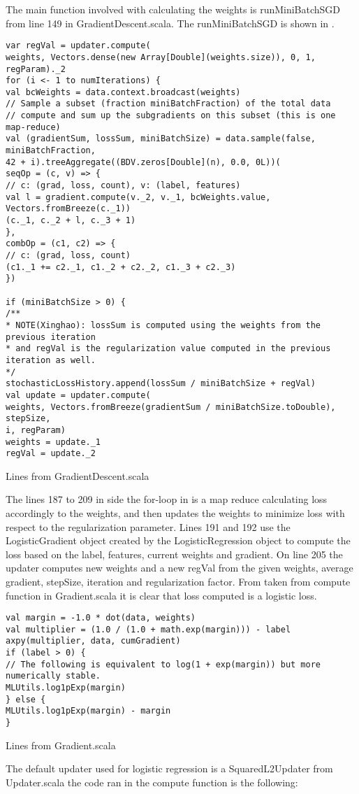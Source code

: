 The main function involved with calculating the weights is runMiniBatchSGD from line 149 in GradientDescent.scala. The runMiniBatchSGD is shown in . 
\begin{listing}[H]
\begin{verbatim}
var regVal = updater.compute(
weights, Vectors.dense(new Array[Double](weights.size)), 0, 1, regParam)._2
for (i <- 1 to numIterations) {
val bcWeights = data.context.broadcast(weights)
// Sample a subset (fraction miniBatchFraction) of the total data
// compute and sum up the subgradients on this subset (this is one map-reduce)
val (gradientSum, lossSum, miniBatchSize) = data.sample(false, miniBatchFraction,
42 + i).treeAggregate((BDV.zeros[Double](n), 0.0, 0L))(
seqOp = (c, v) => {
// c: (grad, loss, count), v: (label, features)
val l = gradient.compute(v._2, v._1, bcWeights.value, Vectors.fromBreeze(c._1))
(c._1, c._2 + l, c._3 + 1)
},
combOp = (c1, c2) => {
// c: (grad, loss, count)
(c1._1 += c2._1, c1._2 + c2._2, c1._3 + c2._3)
})

if (miniBatchSize > 0) {
/**
* NOTE(Xinghao): lossSum is computed using the weights from the previous iteration
* and regVal is the regularization value computed in the previous iteration as well.
*/
stochasticLossHistory.append(lossSum / miniBatchSize + regVal)
val update = updater.compute(
weights, Vectors.fromBreeze(gradientSum / miniBatchSize.toDouble), stepSize,
i, regParam)
weights = update._1
regVal = update._2
\end{verbatim}
\caption{Lines from GradientDescent.scala}
\label{lst:runMiniBatchSGD}
\end{listing}
The lines 187 to 209 in side the for-loop in  is a map reduce calculating loss accordingly to the weights, and then updates the weights to minimize loss with respect to the regularization parameter. Lines 191 and 192 use the LogisticGradient object created by the LogisticRegression object to compute the loss based on the label, features, current weights and gradient. On line 205 the updater computes new weights and a new regVal from the given weights, average gradient, stepSize, iteration and regularization factor.
From  taken from compute function in Gradient.scala it is clear that loss computed is a logistic loss.  
\begin{listing}[H]
\begin{verbatim}
val margin = -1.0 * dot(data, weights)
val multiplier = (1.0 / (1.0 + math.exp(margin))) - label
axpy(multiplier, data, cumGradient)
if (label > 0) {
// The following is equivalent to log(1 + exp(margin)) but more numerically stable.
MLUtils.log1pExp(margin)
} else {
MLUtils.log1pExp(margin) - margin
}
\end{verbatim}
\caption{Lines from Gradient.scala}
\label{lst:sparkloss}
\end{listing}
The default updater used for logistic regression is a SquaredL2Updater from Updater.scala
the code ran in the compute function is the following:


